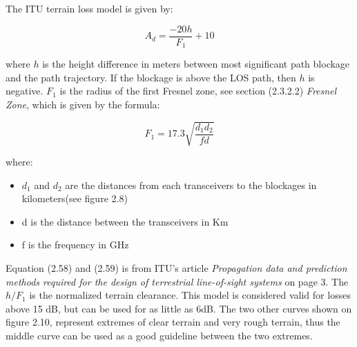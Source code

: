 The ITU terrain loss model is given by:

\begin{equation}
    A_d = \frac{-20h}{F_1}+10
\end{equation}

where $h$ is the height difference in meters between most significant path blockage and the path trajectory. If the blockage is above the LOS path, then $h$ is negative. $F_1$ is the radius of the first Fresnel zone, see section (2.3.2.2) \textit{Fresnel Zone}, which is given by the formula:

\begin{equation}
    F_1 = 17.3 \sqrt{\frac{d_1d_2}{fd}}
\end{equation}

where:

\begin{itemize}
  \item $d_1$ and $d_2$ are the distances from each transceivers to the blockages in kilometers(see figure 2.8)
  \item d is the distance between the transceivers in Km
  \item f is the frequency in GHz
\end{itemize}

Equation (2.58) and (2.59) is from ITU's article \textit{Propagation data and prediction methods required for the design of terrestrial line-of-sight systems}\cite{ITUTerrain} on page 3. The $h/F_1$ is the normalized terrain clearance. This model is considered valid for losses above 15 dB, but can be used for as little as 6dB. The two other curves shown on figure 2.10, represent extremes of clear terrain and very rough terrain, thus the middle curve can be used as a good guideline between the two extremes.  

